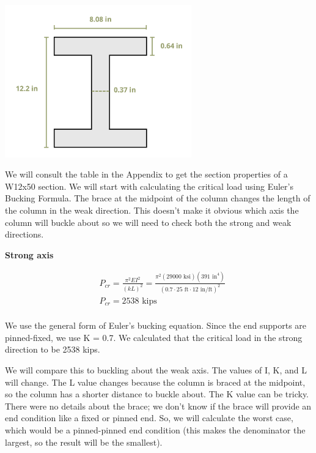 \documentclass[
  letterpaper,
  DIV=11,
  numbers=noendperiod]{scrreprt}
\begin{document}
\begin{tcolorbox}
\begin{tcolorbox}
\begin{center}
\includegraphics[width=3.17708in,height=\textheight]{images/CH15s PNGs/example 15.3 copy.png}
\end{center}

We will consult the table in the Appendix to get the section properties
of a W12x50 section. We will start with calculating the critical load
using Euler's Bucking Formula. The brace at the midpoint of the column
changes the length of the column in the weak direction. This doesn't
make it obvious which axis the column will buckle about so we will need
to check both the strong and weak directions.

\textbf{Strong axis}

\[
\begin{aligned}
& P_{cr}=\frac{\pi^2 E I^2}{(k L)^2}=\frac{\pi^2(29000 \text{ ksi})\left(391{\text{ in}^4}\right)}{\left(0.7 \cdot 25 \text{ ft} \cdot 12{\text{ in/ft}}\right)^2} \\
& P_{c r}=2538 \text { kips} \\
&
\end{aligned}
\]

We use the general form of Euler's bucking equation. Since the end
supports are pinned-fixed, we use K = 0.7. We calculated that the
critical load in the strong direction to be 2538 kips.

We will compare this to buckling about the weak axis. The values of I,
K, and L will change. The L value changes because the column is braced
at the midpoint, so the column has a shorter distance to buckle about.
The K value can be tricky. There were no details about the brace; we
don't know if the brace will provide an end condition like a fixed or
pinned end. So, we will calculate the worst case, which would be a
pinned-pinned end condition (this makes the denominator the largest, so
the result will be the smallest).


\end{tcolorbox}
\end{tcolorbox}
\end{document}
